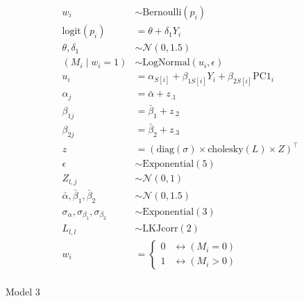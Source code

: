 \documentclass[
  letterpaper,
  DIV=11,
  numbers=noendperiod]{scrartcl}
\makeatletter
\let\oldparagraph\paragraph
\renewcommand{\paragraph}{
    \@ifstar
      \xxxParagraphStar
      \xxxParagraphNoStar
  }
\newcommand{\xxxParagraphStar}[1]{\oldparagraph*{#1}\mbox{}}
\newcommand{\xxxParagraphNoStar}[1]{\oldparagraph{#1}\mbox{}}
\makeatother
\begin{document}
\[
\begin{aligned}
w_i &\sim \mathrm{Bernoulli}(p_i) \\
\text{logit}(p_i) &= \theta + \delta_1 Y_i \\
\theta, \delta_1 &\sim \mathcal{N}(0, 1.5) \\
(M_i \mid w_i = 1) &\sim \mathrm{LogNormal}(u_i, \epsilon) \\
u_i &= \alpha_{S[i]} + \beta_{1S[i]} Y_i + \beta_{2S[i]} \mathrm{PC1}_i \\
\alpha_j &= \bar{\alpha} + z_{.1} \\
\beta_{1j} &= \bar{\beta}_1 + z_{.2} \\
\beta_{2j} &= \bar{\beta}_2 + z_{.3} \\
z &= \left( \mathrm{diag}(\sigma) \times \mathrm{cholesky}(L) \times Z \right)^\top \\
\epsilon &\sim \mathrm{Exponential}(5) \\
Z_{l,j} &\sim \mathcal{N}(0, 1) \\
\bar{\alpha}, \bar{\beta}_1, \bar{\beta}_2 &\sim \mathcal{N}(0, 1.5) \\
\sigma_\alpha, \sigma_{\beta_1}, \sigma_{\beta_2} &\sim \mathrm{Exponential}(3) \\
L_{l,l} &\sim \mathrm{LKJcorr}(2) \\
w_i &=
\begin{cases}
0 & \leftrightarrow (M_i = 0) \\
1 & \leftrightarrow (M_i > 0)
\end{cases}
\end{aligned}
\]

\paragraph{Model 3}\label{model-3}
\end{document}
